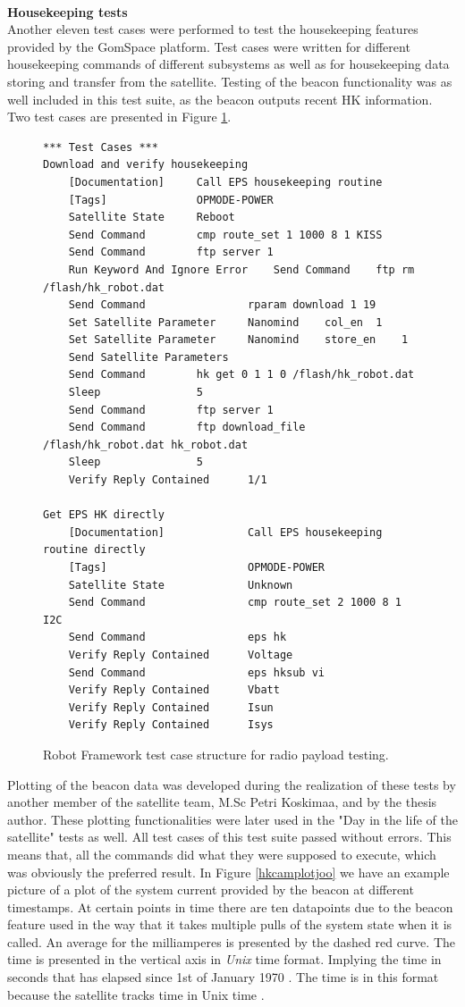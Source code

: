 \documentclass[english,12pt,a4paper,pdftex,elec,utf8]{aaltothesis}
\begin{document}
\\
\textbf{Housekeeping tests}
\\ 
Another eleven test cases were performed to test the housekeeping features provided by the GomSpace platform. Test cases were written for different housekeeping commands of different subsystems as well as for housekeeping data storing and transfer from the satellite. Testing of the beacon functionality was as well included in this test suite, as the beacon outputs recent HK information. Two test cases are presented in Figure \ref{robothk}. \par
\begin{figure}[h!]
\centering
\begin{verbatim}
*** Test Cases ***
Download and verify housekeeping
	[Documentation]		Call EPS housekeeping routine
	[Tags]				OPMODE-POWER
	Satellite State 	Reboot
	Send Command 		cmp route_set 1 1000 8 1 KISS
	Send Command 		ftp server 1
	Run Keyword And Ignore Error 	Send Command 	ftp rm /flash/hk_robot.dat
	Send Command 				rparam download 1 19
	Set Satellite Parameter		Nanomind	col_en 	1
	Set Satellite Parameter		Nanomind	store_en 	1
	Send Satellite Parameters
	Send Command 		hk get 0 1 1 0 /flash/hk_robot.dat
	Sleep 				5
	Send Command 		ftp server 1
	Send Command 		ftp download_file /flash/hk_robot.dat hk_robot.dat
	Sleep 				5
	Verify Reply Contained	  	1/1

Get EPS HK directly
	[Documentation]				Call EPS housekeeping routine directly
	[Tags]						OPMODE-POWER
	Satellite State 			Unknown
	Send Command 				cmp route_set 2 1000 8 1 I2C
	Send Command 				eps hk
	Verify Reply Contained 		Voltage
	Send Command 				eps hksub vi
	Verify Reply Contained 		Vbatt
	Verify Reply Contained 		Isun
	Verify Reply Contained 		Isys
\end{verbatim}
\caption{Robot Framework test case structure for radio payload testing.}
\label{robothk}
\end{figure}  
Plotting of the beacon data was developed during the realization of these tests by another member of the satellite team, M.Sc Petri Koskimaa, and by the thesis author. These plotting functionalities were later used in the "Day in the life of the satellite" tests as well. All test cases of this test suite passed without errors. This means that, all the commands did what they were supposed to execute, which was obviously the preferred result. In Figure \ref{hkcamplotjoo} we have an example picture of a plot of the system current provided by the beacon at different timestamps. At certain points in time there are ten datapoints due to the beacon feature used in the way that it takes multiple pulls of the system state when it is called. An average for the milliamperes is presented by the dashed red curve. The time is presented in the vertical axis in \textit{Unix} time format. Implying the time in seconds that has elapsed since 1st of January 1970 \cite{linuxproginterface}. The time is in this format because the satellite tracks time in Unix time \cite{nanomindds}.\par 
\end{document}
